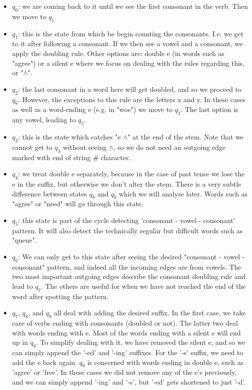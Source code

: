\documentclass[11pt,journal]{article}
\begin{document}
	\begin{itemize}
		\item $q_0$: we are coming back to it until we see the first consonant in the verb. Then we move to $q_1$
		
		\item $q_1$: this is the state from which be begin counting the consonants. I.e. we get to it after following a consonant. If we then see a vowel and a consonant, we apply the doubling rule. Other options are: double e (in words such as "agree") or a silent e where we focus on dealing with the rules regarding this, or "$\wedge$".
		
		\item $q_2$: the last consonant in a word here will get doubled, and so we proceed to $q_6$. However, the exceptions to this rule are the letters x and y. In these cases as well as a word-ending e (e.g. in "woe") we move to $q_3$. The last option is any vowel, leading to $q_5$.
		
		\item $q_3$: this is the state which catches "e $\wedge$" at the end of the stem. Note that we cannot get to $q_3$ without seeing $\wedge$, so we do not need an outgoing edge marked with end of string \# character.
		
		\item $q_4$: we treat double e separately, because in the case of past tense we lose the e in the suffix, but otherwise we don't alter the stem. There is a  very subtle difference between states $q_8$ and $q_9$ which we will analyse later. Words such as "agree" or "need" will go through this state.
	
		\item $q_5$: this state is part of the cycle detecting 'consonant - vowel - consonant' pattern. It will also detect the technically regular but difficult words such as "queue".
		
		\item $q_6$: We can only get to this state after seeing the desired "consonant - vowel - consonant" pattern, and indeed all the incoming edges are from vowels. The two most important outgoing edges describe the consonant doubling rule and lead to $q_7$. The others are useful for when we have not reached the end of the word after spotting the pattern.
		
		\item $q_7$, $q_8$, and $q_9$ all deal with adding the desired suffix. In the first case, we take care of verbs ending with consonants (doubled or not). The latter two deal with words ending with e. Most of the words ending with a silent e will end up in $q_8$. To simplify dealing with it, we have removed the silent e, and so we can simply append the '-ed' and '-ing' suffixes. For the '-s' suffix, we need to add the e back again. $q_9$ is concerned with words ending in double e, such as 'agree' or 'free'. In these cases we did not remove any of the e's previously, and we can simply append '-ing' and '-s', but '-ed' gets shortened to just '-d'.
		

\end{itemize}
\end{document}
